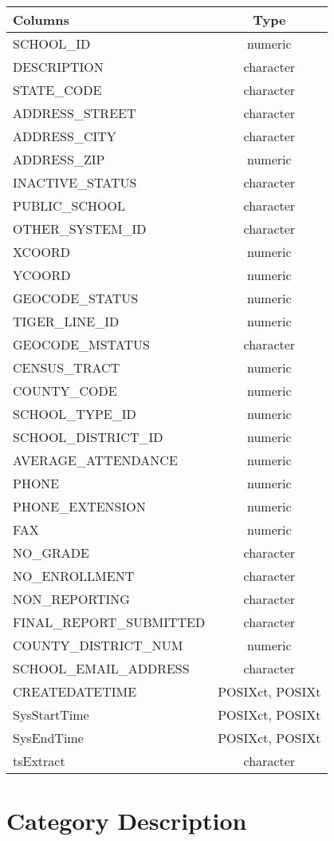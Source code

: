 \documentclass[
  letterpaper,
  DIV=11,
  numbers=noendperiod]{scrreprt}
\begin{document}
\begin{longtable}{lc}
\toprule
Columns & Type \\ 
\midrule
SCHOOL\_ID & numeric \\ 
DESCRIPTION & character \\ 
STATE\_CODE & character \\ 
ADDRESS\_STREET & character \\ 
ADDRESS\_CITY & character \\ 
ADDRESS\_ZIP & numeric \\ 
INACTIVE\_STATUS & character \\ 
PUBLIC\_SCHOOL & character \\ 
OTHER\_SYSTEM\_ID & character \\ 
XCOORD & numeric \\ 
YCOORD & numeric \\ 
GEOCODE\_STATUS & numeric \\ 
TIGER\_LINE\_ID & numeric \\ 
GEOCODE\_MSTATUS & character \\ 
CENSUS\_TRACT & numeric \\ 
COUNTY\_CODE & numeric \\ 
SCHOOL\_TYPE\_ID & numeric \\ 
SCHOOL\_DISTRICT\_ID & numeric \\ 
AVERAGE\_ATTENDANCE & numeric \\ 
PHONE & numeric \\ 
PHONE\_EXTENSION & numeric \\ 
FAX & numeric \\ 
NO\_GRADE & character \\ 
NO\_ENROLLMENT & character \\ 
NON\_REPORTING & character \\ 
FINAL\_REPORT\_SUBMITTED & character \\ 
COUNTY\_DISTRICT\_NUM & numeric \\ 
SCHOOL\_EMAIL\_ADDRESS & character \\ 
CREATEDATETIME & POSIXct, POSIXt \\ 
SysStartTime & POSIXct, POSIXt \\ 
SysEndTime & POSIXct, POSIXt \\ 
tsExtract & character \\ 
\bottomrule
\end{longtable}

\hypertarget{category-description-34}{%
\section*{Category Description}\label{category-description-34}}
\end{document}
